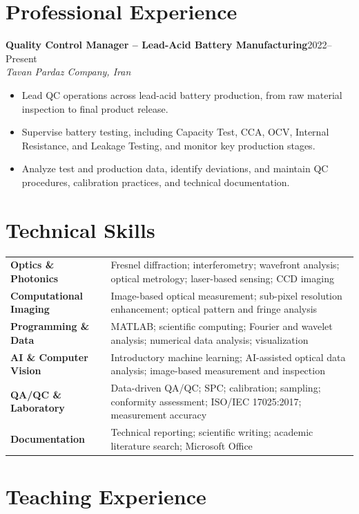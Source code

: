 \documentclass[11pt,a4paper]{article}
\newcommand{\entry}[4]{%
  \textbf{#1}\hfill {\color{light}#2}\\
  \textit{#3}\\[-1pt]
  #4\vspace{3pt}
}
\begin{document}
\section*{Professional Experience}

\entry{Quality Control Manager -- Lead-Acid Battery Manufacturing}{2022--Present}
{Tavan Pardaz Company, Iran}
{
\begin{itemize}
  \item Lead QC operations across lead-acid battery production, from raw material inspection to final product release.
  \item Supervise battery testing, including Capacity Test, CCA, OCV, Internal Resistance, and Leakage Testing, and monitor key production stages.
  \item Analyze test and production data, identify deviations, and maintain QC procedures, calibration practices, and technical documentation.
\end{itemize}
}

\section*{Technical Skills}
\begin{tabularx}{\textwidth}{>{\bfseries}p{}X}
Optics \& Photonics & Fresnel diffraction; interferometry; wavefront analysis; optical metrology; laser-based sensing; CCD imaging \\
Computational Imaging & Image-based optical measurement; sub-pixel resolution enhancement; optical pattern and fringe analysis \\
Programming \& Data & MATLAB; scientific computing; Fourier and wavelet analysis; numerical data analysis; visualization \\
AI \& Computer Vision & Introductory machine learning; AI-assisted optical data analysis; image-based measurement and inspection \\
QA/QC \& Laboratory & Data-driven QA/QC; SPC; calibration; sampling; conformity assessment; ISO/IEC 17025:2017; measurement accuracy \\
Documentation & Technical reporting; scientific writing; academic literature search; Microsoft Office \\
\end{tabularx}

\section*{Teaching Experience}
\end{document}
